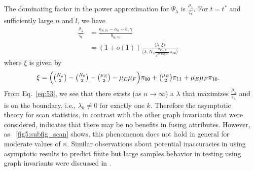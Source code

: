 \documentclass[10pt,draftclsnofoot,onecolumn]{IEEEtran}
\theoremstyle{definition}
\begin{document}
The dominating factor in the power approximation for $\Psi_{\lambda}$
is $\tfrac{\rho_{\lambda}}{\varsigma_{\lambda}}$. For $t = t^{*}$ and
sufficiently large $n$ and $l$, we have
\begin{equation}
  \label{eq:53}
  \begin{split}
    \frac{\rho_{\lambda}}{\varsigma_{l}} &= \frac{a_{n,m} - a_n - b_n
      \gamma}{b_{n,m}} \\
    &= (1 + o(1)) \frac{ \langle \lambda, \xi \rangle}{\langle
      \lambda, N_{\kappa} \tfrac{\sigma_{E+F}}{\sqrt{2 \log{n}}}
      \pi_{00} \rangle}
  \end{split}
\end{equation}
where $\xi$ is given by
\begin{equation*}
 \xi =  \Bigl(\tbinom{N_{\kappa}}{2} -
    \tbinom{N_0}{2} - \tbinom{\mu_E}{2} - \mu_E \mu_F\Bigr)\pi_{00} +
    \tbinom{\mu_{E}}{2} \pi_{11} + \mu_E \mu_F \pi_{10}.
\end{equation*}
From Eq.~\eqref{eq:53}, we see that there exists (as $n \rightarrow
\infty$) a $\lambda$ that maximizes
$\tfrac{\rho_\lambda}{\varsigma_{\lambda}}$ and is on the boundary,
i.e., $\lambda_k \not = 0$ for exactly one $k$. Therefore the asymptotic theory
for scan statistics, in contrast with the other graph invariants that
were considered, indicates that there may be no benefits in fusing
attributes. However, as \figurename~\ref{fig5:subfig_scan} shows, this
phenomenon does not hold in general for moderate values of
$n$. Similar observations about potential inaccuracies in using
asymptotic results to predict finite but large samples behavior
in testing using graph invariants were discussed in
\cite{rukhin11,priebe10:_you_i}.   
\end{document}
